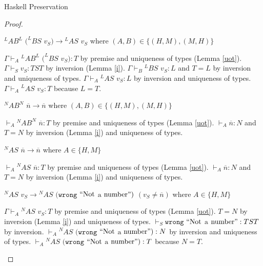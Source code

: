 \begin{theorem}{Haskell Preservation}
\begin{proof}

\begin{case}
$^{L}AB^{L}$ $(^{L}BS$ $v_{S})\rightarrow{^{L}A}S$ $v_{S}$ where $(A,B)\in\lbrace(H,M),(M,H)\rbrace$

$\Gamma\vdash_{A}{^{L}A}B^{L}$ $(^{L}BS$ $v_{S}):T$ by premise and uniqueness of types (Lemma \ref{uot}).  $\Gamma\vdash_{S}v_{S}:TST$ by inversion (Lemma \ref{i}).  $\Gamma\vdash_{B}{^{L}B}S$ $v_{S}:L$ and $T=L$ by inversion and uniqueness of types.  $\Gamma\vdash_{A}{^{L}A}S$ $v_{S}:L$ by inversion and uniqueness of types.  $\Gamma\vdash_{A}{^{L}A}S$ $v_{S}:T$ because $L=T$.
\end{case}


\begin{case}
$^{N}AB^{N}$ $\overline{n}\rightarrow\overline{n}$ where $(A,B)\in\lbrace(H,M),(M,H)\rbrace$

$\vdash_{A}{^{N}A}B^{N}$ $\overline{n}:T$ by premise and uniqueness of types (Lemma \ref{uot}).  $\vdash_{A}\overline{n}:N$ and $T=N$ by inversion (Lemma \ref{i}) and uniqueness of types.
\end{case}


\begin{case}
$^{N}AS$ $\overline{n}\rightarrow\overline{n}$ where $A\in\lbrace H,M\rbrace$

$\vdash_{A}{^{N}A}S$ $\overline{n}:T$ by premise and uniqueness of types (Lemma \ref{uot}).  $\vdash_{A}\overline{n}:N$ and $T=N$ by inversion (Lemma \ref{i}) and uniqueness of types.
\end{case}


\begin{case}
$^{N}AS$ $v_{S}\rightarrow{^{N}A}S$ $(\mathtt{wrong}$ $\mathrm{``Not}$ $\mathrm{a}$ $\mathrm{number"})$ $(v_{S}\neq\overline{n})$ where $A\in\lbrace H,M\rbrace$

$\Gamma\vdash_{A}{^{N}AS}$ $v_{S}:T$ by premise and uniqueness of types (Lemma \ref{uot}).  $T=N$ by inversion (Lemma \ref{i}) and uniqueness of types.  $\vdash_{S}\mathtt{wrong}$ $\mathrm{``Not}$ $\mathrm{a}$ $\mathrm{number"}:TST$ by inversion.  $\vdash_{A}{^{N}A}S$ $(\mathtt{wrong}$ $\mathrm{``Not}$ $\mathrm{a}$ $\mathrm{number"}):N$ by inversion and uniqueness of types.  $\vdash_{A}{^{N}A}S$ $(\mathtt{wrong}$ $\mathrm{``Not}$ $\mathrm{a}$ $\mathrm{number"}):T$ because $N=T$.
\end{case}


\end{proof}
\end{theorem}
